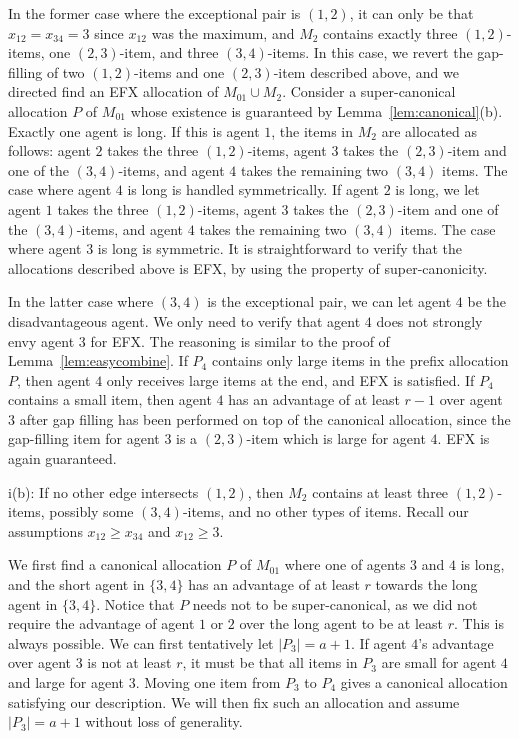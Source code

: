 \documentclass{article}
\theoremstyle{definition}
\begin{document}
In the former case where the exceptional pair is $(1,2)$, it can only be that $x_{12}=x_{34}=3$ since $x_{12}$ was the maximum, and $M_2$ contains exactly three $(1,2)$-items, one $(2,3)$-item, and three $(3,4)$-items.
In this case, we revert the gap-filling of two $(1,2)$-items and one $(2,3)$-item described above, and we directed find an EFX allocation of $M_{01}\cup M_2$.
Consider a super-canonical allocation $P$ of $M_{01}$ whose existence is guaranteed by Lemma~\ref{lem:canonical}(b).
Exactly one agent is long.
If this is agent $1$, the items in $M_2$ are allocated as follows: agent $2$ takes the three $(1,2)$-items, agent $3$ takes the $(2,3)$-item and one of the $(3,4)$-items, and agent $4$ takes the remaining two $(3,4)$ items.
The case where agent $4$ is long is handled symmetrically.
If agent $2$ is long, we let agent $1$ takes the three $(1,2)$-items, agent $3$ takes the $(2,3)$-item and one of the $(3,4)$-items, and agent $4$ takes the remaining two $(3,4)$ items.
The case where agent $3$ is long is symmetric.
It is straightforward to verify that the allocations described above is EFX, by using the property of super-canonicity.

In the latter case where $(3,4)$ is the exceptional pair, we can let agent $4$ be the disadvantageous agent.
We only need to verify that agent $4$ does not strongly envy agent $3$ for EFX.
The reasoning is similar to the proof of Lemma~\ref{lem:easycombine}.
If $P_4$ contains only large items in the prefix allocation $P$, then agent $4$ only receives large items at the end, and EFX is satisfied.
If $P_4$ contains a small item, then agent $4$ has an advantage of at least $r-1$ over agent $3$ after gap filling has been performed on top of the canonical allocation, since the gap-filling item for agent $3$ is a $(2,3)$-item which is large for agent $4$.
EFX is again guaranteed.

i(b): If no other edge intersects $(1,2)$, then $M_2$ contains at least three $(1,2)$-items, possibly some $(3,4)$-items, and no other types of items.
Recall our assumptions $x_{12}\geq x_{34}$ and $x_{12}\geq3$.

We first find a canonical allocation $P$ of $M_{01}$ where one of agents $3$ and $4$ is long, and the short agent in $\{3,4\}$ has an advantage of at least $r$ towards the long agent in $\{3,4\}$.
Notice that $P$ needs not to be super-canonical, as we did not require the advantage of agent $1$ or $2$ over the long agent to be at least $r$.
This is always possible.
We can first tentatively let $|P_3|=a+1$.
If agent $4$'s advantage over agent $3$ is not at least $r$, it must be that all items in $P_3$ are small for agent $4$ and large for agent $3$.
Moving one item from $P_3$ to $P_4$ gives a canonical allocation satisfying our description.
We will then fix such an allocation and assume $|P_3|=a+1$ without loss of generality.
\end{document}
